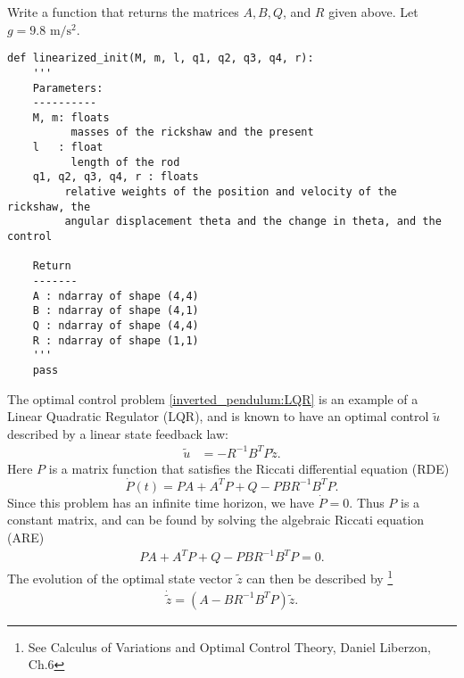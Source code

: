 \begin{problem}
Write a function that returns the matrices $A, B, Q$, and $R$ given above. Let $g = 9.8\text{ m}/\text{s}^2$.	
	
\begin{lstlisting}
def linearized_init(M, m, l, q1, q2, q3, q4, r): 
	'''
	Parameters:
	----------
	M, m: floats
          masses of the rickshaw and the present
	l 	: float
          length of the rod
	q1, q2, q3, q4, r : floats
         relative weights of the position and velocity of the rickshaw, the 
		 angular displacement theta and the change in theta, and the control
	
	Return
	-------
	A : ndarray of shape (4,4) 
	B : ndarray of shape (4,1) 
	Q : ndarray of shape (4,4) 
	R : ndarray of shape (1,1) 
	'''
	pass	
\end{lstlisting}
\end{problem}

The optimal control problem \eqref{inverted_pendulum:LQR} is an example of a Linear Quadratic Regulator (LQR), and is known to have an optimal control $\tilde{u}$ described by a linear state feedback law:
\begin{align*}
\tilde{u} &= -R^{-1}B^TP\tilde{z}.
\end{align*}
Here $P$ is a matrix function that satisfies the Riccati differential equation (RDE)
\[
\dot{P}(t) = PA + A^TP + Q - PBR^{-1}B^T P.  
\]
Since this problem has an infinite time horizon, we have $\dot{P} = 0$. Thus $P$ is a constant matrix, and can be found by solving the algebraic Riccati equation (ARE)
\begin{align}
 PA + A^TP + Q - PBR^{-1}B^T P = 0.  \label{inverted_pendulum:ARE}
\end{align}
The evolution of the optimal state vector $\tilde{z}$ can then be described by \footnote{See Calculus of Variations and Optimal Control Theory, Daniel Liberzon, Ch.6}
\begin{align}
\dot{\tilde{z}} = (A - BR^{-1}B^TP)\tilde{z}. \label{inverted_pendulum:optimal_state}
\end{align}

